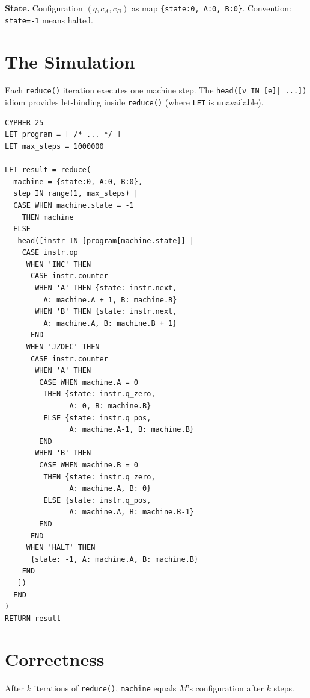 \documentclass[9pt,a4paper,twocolumn]{article}
\begin{document}
\textbf{State.} Configuration $(q, c_A, c_B)$ as map
\texttt{\{state:0, A:0, B:0\}}. Convention: \texttt{state=-1} means halted.

\section{The Simulation}

Each \texttt{reduce()} iteration executes one machine step.
The \texttt{head([v IN [e]| ...])} idiom provides let-binding
inside \texttt{reduce()} (where \texttt{LET} is unavailable).

\begin{smallcode}
\begin{lstlisting}[style=cypher-dense]
CYPHER 25
LET program = [ /* ... */ ]
LET max_steps = 1000000

LET result = reduce(
  machine = {state:0, A:0, B:0},
  step IN range(1, max_steps) |
  CASE WHEN machine.state = -1
    THEN machine
  ELSE
   head([instr IN [program[machine.state]] |
    CASE instr.op
     WHEN 'INC' THEN
      CASE instr.counter
       WHEN 'A' THEN {state: instr.next,
         A: machine.A + 1, B: machine.B}
       WHEN 'B' THEN {state: instr.next,
         A: machine.A, B: machine.B + 1}
      END
     WHEN 'JZDEC' THEN
      CASE instr.counter
       WHEN 'A' THEN
        CASE WHEN machine.A = 0
         THEN {state: instr.q_zero,
               A: 0, B: machine.B}
         ELSE {state: instr.q_pos,
               A: machine.A-1, B: machine.B}
        END
       WHEN 'B' THEN
        CASE WHEN machine.B = 0
         THEN {state: instr.q_zero,
               A: machine.A, B: 0}
         ELSE {state: instr.q_pos,
               A: machine.A, B: machine.B-1}
        END
      END
     WHEN 'HALT' THEN
      {state: -1, A: machine.A, B: machine.B}
    END
   ])
  END
)
RETURN result
\end{lstlisting}
\end{smallcode}

\section{Correctness}

\begin{stheorem}[Claim]
After $k$ iterations of \texttt{reduce()}, \texttt{machine} equals
$M$'s configuration after $k$ steps.
\end{stheorem}
\end{document}
